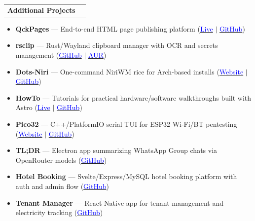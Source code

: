 \documentclass[letterpaper,11pt]{article}
\makeatletter
\newcommand{\resumeItem}[1]{
  \item\small{
    {#1 \vspace{-2pt}}
  }
}
\newcommand{\resumeProjectHeading}[3]{%
    \item
    \begin{tabular*}{0.97\textwidth}[t]{l@{\extracolsep{\fill}}r}
      \textbf{#1} & \small #3 \\
    \end{tabular*}
    \if\relax\detokenize{#2}\relax
    \else
      {\small #2\par}
    \fi
    \vspace{-7pt}
}
\newcommand{\resumeCompactProject}[3]{%
  \resumeItem{\textbf{#1} --- #3 (#2)}
}
\newcommand{\resumeItemListStart}{\begin{itemize}[leftmargin=0.18in, itemsep=1pt, topsep=1pt, parsep=0pt]}
\newcommand{\resumeItemListEnd}{\end{itemize}\vspace{-5pt}}
\makeatother
\begin{document}
\resumeProjectHeading
{Additional Projects}{}{ }
\resumeItemListStart
\resumeCompactProject
{QckPages}
{\href{https://qckpage.jr4.in/}{\textcolor{blue}{Live}} $|$ \href{https://github.com/jR4dh3y/qckpages}{\textcolor{blue}{GitHub}}}
{End-to-end HTML page publishing platform}
\resumeCompactProject
{rsclip}
{\href{https://github.com/jR4dh3y/rsclip}{\textcolor{blue}{GitHub}} $|$ \href{https://aur.archlinux.org/packages/rsclip-bin}{\textcolor{blue}{AUR}}}
{Rust/Wayland clipboard manager with OCR and secrets management}
\resumeCompactProject
{Dots-Niri}
{\href{https://rice.jr4.in/}{\textcolor{blue}{Website}} $|$ \href{https://github.com/jR4dh3y/dots-niri}{\textcolor{blue}{GitHub}}}
{One-command NiriWM rice for Arch-based installs}
\resumeCompactProject
{HowTo}
{\href{https://howto.jr4.in/}{\textcolor{blue}{Live}} $|$ \href{https://github.com/jR4dh3y/howTo}{\textcolor{blue}{GitHub}}}
{Tutorials for practical hardware/software walkthroughs built with Astro}
\resumeCompactProject
{Pico32}
{\href{https://pico32.radhey.dev}{\textcolor{blue}{Website}} $|$ \href{https://github.com/jR4dh3y/Pico32}{\textcolor{blue}{GitHub}}}
{C++/PlatformIO serial TUI for ESP32 Wi-Fi/BT pentesting}
\resumeCompactProject
{TL;DR}
{\href{https://github.com/jR4dh3y/tldr-desktop}{\textcolor{blue}{GitHub}}}
{Electron app summarizing WhatsApp Group chats via OpenRouter models}
\resumeCompactProject
{Hotel Booking}
{\href{https://github.com/jR4dh3y/hotel-booking}{\textcolor{blue}{GitHub}}}
{Svelte/Express/MySQL hotel booking platform with auth and admin flow}
\resumeCompactProject
{Tenant Manager}
{\href{https://github.com/jR4dh3y/tennet-manager}{\textcolor{blue}{GitHub}}}
{React Native app for tenant management and electricity tracking}
\resumeItemListEnd
\end{document}
